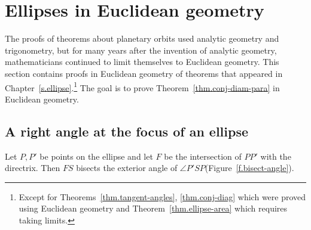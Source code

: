
\chapter{Ellipses in Euclidean geometry}\label{s.geometry}

The proofs of theorems about planetary orbits used analytic geometry and trigonometry, but for many years after the invention of analytic geometry, mathematicians continued to limit themselves to Euclidean geometry. This section contains proofs in Euclidean geometry of theorems that appeared in Chapter~\ref{s.ellipse}.\footnote{Except for Theorems~\ref{thm.tangent-angles}, \ref{thm.conj-diag} which were proved using Euclidean geometry and Theorem~\ref{thm.ellipse-area} which requires taking limits.} The goal is to prove Theorem~\ref{thm.conj-diam-para} in Euclidean geometry.

\begin{center}
\end{center}


\section{A right angle at the focus of an ellipse}

\begin{theorem}\label{thm.bisect}
Let $P,P'$ be points on the ellipse and let $F$ be the intersection of $PP'$ with the directrix. Then $FS$ bisects the exterior angle of $\angle P'SP$(Figure~\ref{f.bisect-angle}).
\end{theorem}


